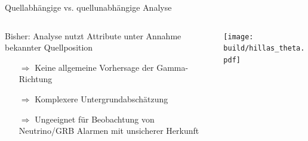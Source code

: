 \documentclass[aspectratio=1610, 9pt]{beamer}
\begin{document}
\begin{frame}[c]{Quellabhängige vs. quellunabhängige Analyse}
  \begin{columns}[onlytextwidth, c]
    \begin{column}{0.475\textwidth}
      Bisher: Analyse nutzt Attribute unter Annahme bekannter Quellposition
      \begin{itemize}
        \item[$\Rightarrow$] Keine allgemeine Vorhersage der Gamma-Richtung
        \item[$\Rightarrow$] Komplexere Untergrundabschätzung
        \item[$\Rightarrow$] Ungeeignet für Beobachtung von Neutrino/GRB Alarmen mit unsicherer Herkunft
      \end{itemize}
      \vspace{-1\baselineskip}
      \begin{center}
      \end{center}
    \end{column}
    \hfill
    \begin{column}{0.475\textwidth}
      \texttt{[image: build/hillas\_theta.pdf]}%
    \end{column}
  \end{columns}
\end{frame}


\end{document}
